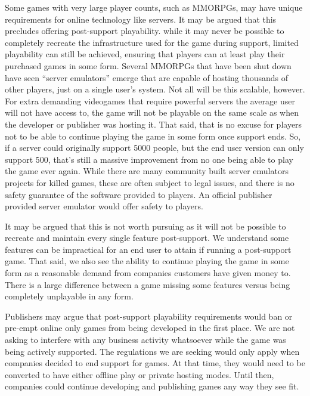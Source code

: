 Some games with very large player counts, such as MMORPGs, may have unique requirements for online technology like servers.
It may be argued that this precludes offering post-support playability.
while it may never be possible to completely recreate the infrastructure used for the game during support,
limited playability can still be achieved, ensuring that players can at least play their purchased games in some form.
Several MMORPGs that have been shut down have seen ``server emulators'' emerge that are capable of hosting thousands of other players, just on a single user's system.
Not all will be this scalable, however.
For extra demanding videogames that require powerful servers the average user will not have access to,
the game will not be playable on the same scale as when the developer or publisher was hosting it.
That said, that is no excuse for players not to be able to continue playing the game in some form once support ends.
So, if a server could originally support 5000 people, but the end user version can only support 500,
that's still a massive improvement from no one being able to play the game ever again.
While there are many community built server emulators projects for killed games\cite{emulator-list-2022},
these are often subject to legal issues, and there is no safety guarantee of the software provided to players.
An official publisher provided server emulator would offer safety to players.

It may be argued that this is not worth pursuing as it will not be possible to recreate and maintain every single feature post-support.
We understand some features can be impractical for an end user to attain if running a post-support game.%
That said, we also see the ability to continue playing the game in some form as a reasonable demand from companies customers have given money to.
There is a large difference between a game missing some features versus being completely unplayable in any form.

Publishers may argue that post-support playability requirements would ban or pre-empt online only games from being developed in the first place.
We are not asking to interfere with any business activity whatsoever while the game was being actively supported.
The regulations we are seeking would only apply when companies decided to end support for games.
At that time, they would need to be converted to have either offline play or private hosting modes.
Until then, companies could continue developing and publishing games any way they see fit.

